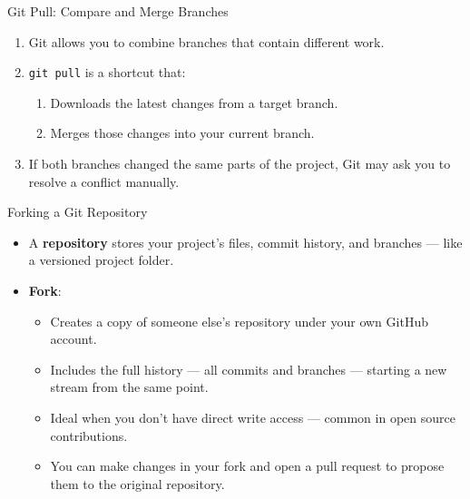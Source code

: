 \documentclass[12pt]{beamer}
\begin{document}
\begin{frame}{Git Pull: Compare and Merge Branches}
  \begin{enumerate}
    \setlength\itemsep{1em}
    \item Git allows you to combine branches that contain different work.
    \item \texttt{git pull} is a shortcut that:
    \begin{enumerate}
      \setlength\itemsep{1em}
      \item Downloads the latest changes from a target branch.
      \item Merges those changes into your current branch.
    \end{enumerate}
    \item If both branches changed the same parts of the project, Git may ask you to resolve a conflict manually.
  \end{enumerate}
\end{frame}

\begin{frame}{Forking a Git Repository}
  \begin{itemize}
    \item A \textbf{repository} stores your project’s files, commit history, and branches — like a versioned project folder.

    \item \textbf{Fork}:
    \begin{itemize}
      \setlength\itemsep{0.5em}
      \item Creates a copy of someone else’s repository under your own GitHub account.
      \item Includes the full history — all commits and branches — starting a new stream from the same point.
      \item Ideal when you don’t have direct write access — common in open source contributions.
      \item You can make changes in your fork and open a pull request to propose them to the original repository.
    \end{itemize}
  \end{itemize}
\end{frame}
\end{document}
